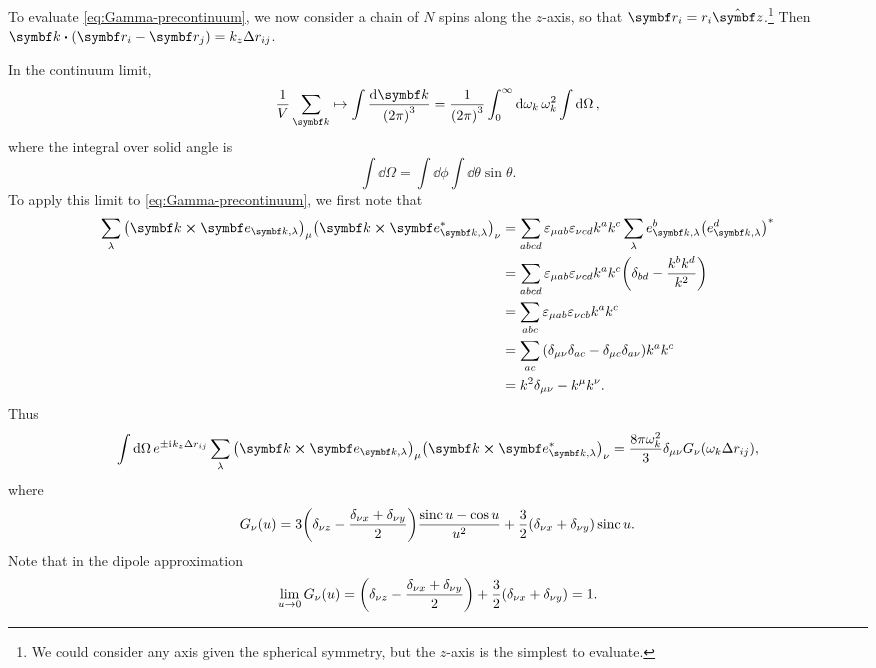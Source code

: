 \documentclass[../thesis.tex]{subfiles}
\begin{document}
To evaluate \cref{eq:Gamma-precontinuum}, we now consider a chain of $N$ spins
along the $z$-axis, so that $\vq{r}_i = r_i \vu{z}$.\footnote{We could consider
any axis given the spherical symmetry, but the $z$-axis is the simplest to
evaluate.} Then $\vq{k} \vdot (\vq{r}_i - \vq{r}_j) = k_z \Delta r_{ij}$.

In the continuum limit,
\begin{equation}
  \frac{1}{V}\sum_{\vq{k}}
  \mapsto
  \int \frac{\dd{\vq{k}}}{{(2\pi)}^3}
  = \frac{1}{{(2\pi)}^3} \int_0^\infty \dd{\omega_k} \omega_k^2
  \int\dd{\Omega},
  \label{eq:continuum-limit}
\end{equation}
where the integral over solid angle is
\begin{equation}
  \int\dd{\Omega}
  = \int\dd{\phi}\int\dd{\theta}\sin\theta.
  \label{eq:solid-angle}
\end{equation}
To apply this limit to \cref{eq:Gamma-precontinuum}, we first note that
\begin{align}
  \sum_\lambda {\qty(\vq{k} \cross \vq{e}_{\vq{k},\lambda})}_\mu
  {\qty(\vq{k} \cross \vq{e}^*_{\vq{k},\lambda})}_\nu
  &= \sum_{abcd} \varepsilon_{\mu ab}\varepsilon_{\nu cd} k^a k^c 
  \sum_\lambda e_{\vq{k},\lambda}^b {\qty(e_{\vq{k},\lambda}^d)}^*
  \\
  &= \sum_{abcd} \varepsilon_{\mu ab}\varepsilon_{\nu cd} k^a k^c 
  \qty(\delta_{bd} - \frac{k^b k^d}{k^2})
  \\
  &= \sum_{abc} \varepsilon_{\mu ab}\varepsilon_{\nu cb} k^a k^c 
  \\
  &= \sum_{ac} \qty(\delta_{\mu\nu}\delta_{ac} - \delta_{\mu c}\delta_{a\nu}) k^a k^c 
  \\
  &= k^2 \delta_{\mu\nu} - k^\mu k^\nu.
\end{align}
Thus
\begin{equation}
  \int\dd{\Omega} e^{\pm\im k_z \Delta r_{ij}}
  \sum_\lambda {\qty(\vq{k} \cross \vq{e}_{\vq{k},\lambda})}_\mu
  {\qty(\vq{k} \cross \vq{e}^*_{\vq{k},\lambda})}_\nu
  = \frac{8\pi\omega_k^2}{3} \delta_{\mu\nu}
  G_{\nu}\qty(\omega_k\Delta r_{ij}),
  \label{eq:angular-integral}
\end{equation}
where
\begin{equation}
  G_{\nu}(u)
  = 3\qty(\delta_{\nu z} - \frac{\delta_{\nu x} + \delta_{\nu y}}{2})
  \frac{\operatorname{\mathrm{sinc}} u - \cos u}{u^2}
  + \frac{3}{2}\qty(\delta_{\nu x} + \delta_{\nu y}) \operatorname{\mathrm{sinc}} u.
\end{equation}
Note that in the dipole approximation
\begin{equation}
  \lim_{u \to 0} G_\nu(u)
  = \qty(\delta_{\nu z} - \frac{\delta_{\nu x} + \delta_{\nu y}}{2})
  + \frac{3}{2}\qty(\delta_{\nu x} + \delta_{\nu y})
  = 1.
\end{equation}
\end{document}
